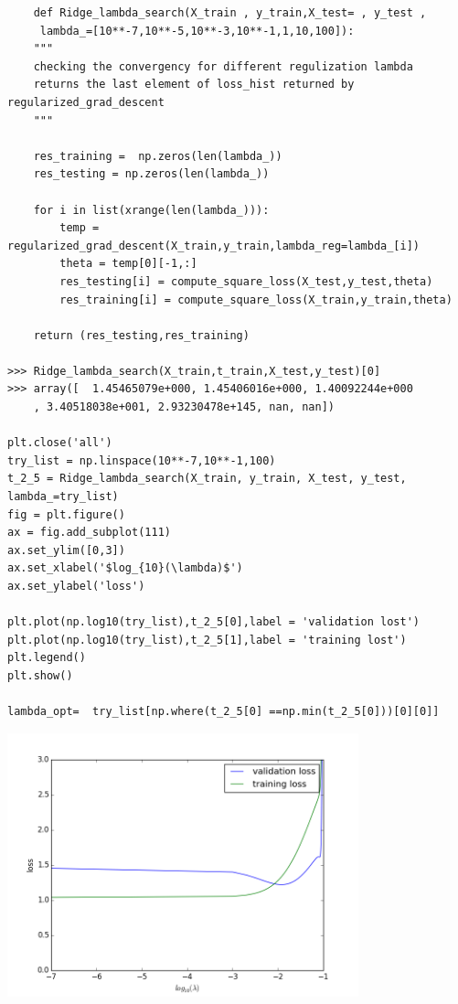 \documentclass{article}
\newenvironment{sub}[2][$-$]{\begin{trivlist}
		\item[\hskip \labelsep {\bfseries #1}\hskip \labelsep {\bfseries #2.}]}  {\end{trivlist}}
\begin{document}
\begin{sub}{2.5.5}
\end{sub}
\begin{verbatim}
	def Ridge_lambda_search(X_train , y_train,X_test= , y_test ,
	 lambda_=[10**-7,10**-5,10**-3,10**-1,1,10,100]): 
	"""
	checking the convergency for different regulization lambda
	returns the last element of loss_hist returned by regularized_grad_descent
	"""
	
	res_training =  np.zeros(len(lambda_))
	res_testing = np.zeros(len(lambda_))
	
	for i in list(xrange(len(lambda_))):
		temp = regularized_grad_descent(X_train,y_train,lambda_reg=lambda_[i])
		theta = temp[0][-1,:]
		res_testing[i] = compute_square_loss(X_test,y_test,theta)
		res_training[i] = compute_square_loss(X_train,y_train,theta)
	
	return (res_testing,res_training)

>>> Ridge_lambda_search(X_train,t_train,X_test,y_test)[0]
>>> array([  1.45465079e+000, 1.45406016e+000, 1.40092244e+000
	, 3.40518038e+001, 2.93230478e+145, nan, nan])
	
plt.close('all')
try_list = np.linspace(10**-7,10**-1,100)
t_2_5 = Ridge_lambda_search(X_train, y_train, X_test, y_test, lambda_=try_list)
fig = plt.figure()
ax = fig.add_subplot(111)
ax.set_ylim([0,3])
ax.set_xlabel('$log_{10}(\lambda)$')
ax.set_ylabel('loss')

plt.plot(np.log10(try_list),t_2_5[0],label = 'validation lost')
plt.plot(np.log10(try_list),t_2_5[1],label = 'training lost')
plt.legend()
plt.show()

lambda_opt=  try_list[np.where(t_2_5[0] ==np.min(t_2_5[0]))[0][0]]

\end{verbatim}
\begin{center}
	\includegraphics[height = 3in]{2_5_5.png}
\end{center}
\end{document}
